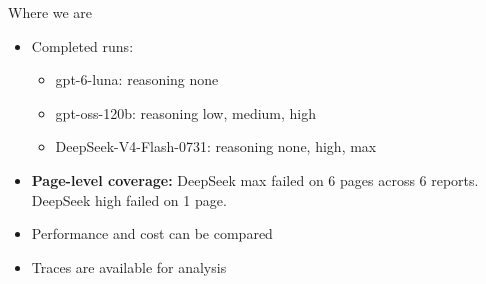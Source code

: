 \documentclass[aspectratio=169, 10pt]{beamer}
\begin{document}
\begin{frame}{Where we are}
\begin{itemize}
  \item Completed runs:
    \begin{itemize}
        \item gpt-6-luna: reasoning none
        \item gpt-oss-120b: reasoning low, medium, high
        \item DeepSeek-V4-Flash-0731: reasoning none, high, max
    \end{itemize}
  \item \textbf{Page-level coverage:} DeepSeek max failed on 6 pages across 6 reports. DeepSeek high failed on 1 page.
  \item Performance and cost can be compared
  \item Traces are available for analysis
\end{itemize}
\end{frame}
\end{document}
